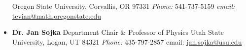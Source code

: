 \documentclass[11pt,letterpaper,sans,unicode]{moderncv}
\begin{document}
\begin{itemize}[leftmargin=8mm]
		\newline Oregon State University, Corvallis, OR 97331
		\newline \emph{Phone:} 	541-737-5159 \qquad \emph{email:} \url{tevian@math.oregonstate.edu}
		\newline
	\item \textbf{Dr. Jan Sojka}
        		\newline Department Chair \& Professor of Physics
		\newline Utah State University, Logan, UT 84321
		\newline \emph{Phone:} 435-797-2857 \qquad email: \url{jan.sojka@usu.edu}
		\newline
	\begin{comment}
	\item \textbf{Dr. Damon T. Spayde} %
       		\newline Department Chair \& Associate Professor of Physics
		\newline Hendrix College, Conway, AR 72032
		\newline \emph{Phone:} 501-450-1251 \qquad email:\url{spayde@hendrix.edu}
		\newline
	\item \textbf{Dr. Shane Larson} \emph{Collaborator}
        		\newline Research Associate Professor
		\newline Center for Interdisciplinary Exploration and Research in Astrophysics (CIERA)
		\newline Northwestern University, Evanston, IL 60208
		\newline \emph{Phone:} 847-467-4305 \qquad \emph{email:}\url{s.larson@northwestern.edu}
		\newline
	\item \textbf{Dr. Todd Tinsley} %
       		\newline Associate Professor of Physics
		\newline Hendrix College, Conway, AR 72032
		\newline \emph{Phone:} 501-450-1404 \qquad email:\url{tinsley@hendrix.edu}
		\newline
	\end{comment}
	\end{itemize}
\end{document}
